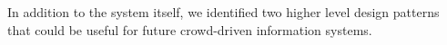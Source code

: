 

In addition to the system itself, we identified two higher level design patterns
that could be useful for future crowd-driven information systems.

% 



